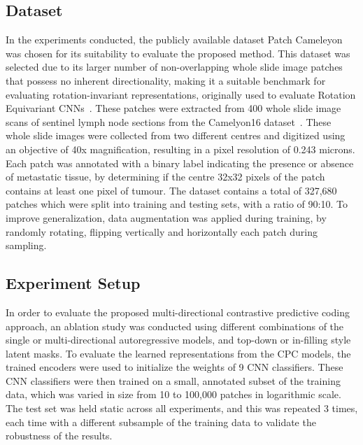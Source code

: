 \subsection{Dataset}
\label{subsec:unsupervised_dataset}
In the experiments conducted, the publicly available dataset Patch Cameleyon~\citep{veeling2018rotation} was chosen for its suitability to evaluate the proposed method. This dataset was selected due to its larger number of non-overlapping whole slide image patches that possess no inherent directionality, making it a suitable benchmark for evaluating rotation-invariant representations, originally used to evaluate Rotation Equivariant CNNs~\citep{veeling2018rotation}. These patches were extracted from 400 whole slide image scans of sentinel lymph node sections from the Camelyon16 dataset~\citep{litjens20181399}. These whole slide images were collected from two different centres and digitized using an objective of 40x magnification, resulting in a pixel resolution of 0.243 microns. Each patch was annotated with a binary label indicating the presence or absence of metastatic tissue, by determining if the centre 32x32 pixels of the patch contains at least one pixel of tumour. The dataset contains a total of 327,680 patches which were split into training and testing sets, with a ratio of 90:10. To improve generalization, data augmentation was applied during training, by randomly rotating, flipping vertically and horizontally each patch during sampling.

\subsection{Experiment Setup}
\label{subsec:unsupervised_experiment}
In order to evaluate the proposed multi-directional contrastive predictive coding approach, an ablation study was conducted using different combinations of the single or multi-directional autoregressive models, and top-down or in-filling style latent masks. To evaluate the learned representations from the CPC models, the trained encoders were used to initialize the weights of 9 CNN classifiers. These CNN classifiers were then trained on a small, annotated subset of the training data, which was varied in size from 10 to 100,000 patches in logarithmic scale. The test set was held static across all experiments, and this was repeated 3 times, each time with a different subsample of the training data to validate the robustness of the results.


